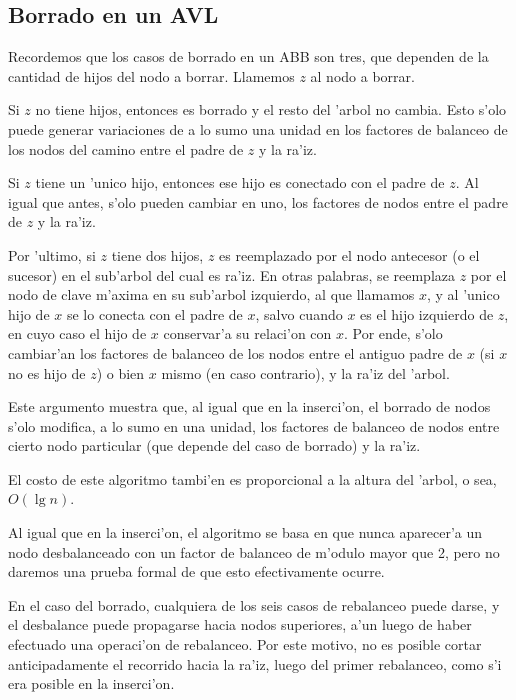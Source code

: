 \subsection{Borrado en un AVL}

Recordemos que los casos de borrado en un ABB son tres, que dependen de la cantidad de hijos del nodo a borrar. Llamemos $z$ al nodo a borrar.

Si $z$ no tiene hijos, entonces es borrado y el resto del 'arbol no cambia. Esto s'olo puede generar variaciones de a lo sumo una unidad en los factores de balanceo de los nodos del camino entre el padre de $z$ y la ra'iz.

Si $z$ tiene un 'unico hijo, entonces ese hijo es conectado con el padre de $z$. Al igual que antes, s'olo pueden cambiar en uno, los factores de nodos entre el padre de $z$ y la ra'iz.

Por 'ultimo, si $z$ tiene dos hijos, $z$ es reemplazado por el nodo antecesor (o el sucesor) en el sub'arbol del cual es ra'iz. En otras palabras, se reemplaza $z$ por el nodo de clave m'axima en su sub'arbol izquierdo, al que llamamos $x$, y al 'unico hijo de $x$ se lo conecta con el padre de $x$, salvo cuando $x$ es el hijo izquierdo de $z$, en cuyo caso el hijo de $x$ conservar'a su relaci'on con $x$. Por ende, s'olo cambiar'an los factores de balanceo de los nodos entre el antiguo padre de $x$ (si $x$ no es hijo de $z$) o bien $x$ mismo (en caso contrario), y la ra'iz del 'arbol.

Este argumento muestra que, al igual que en la inserci'on, el borrado de nodos s'olo modifica, a lo sumo en una unidad, los factores de balanceo de nodos entre cierto nodo particular (que depende del caso de borrado) y la ra'iz.



\begin{algorithm}
  	\DontPrintSemicolon
\end{algorithm}

El costo de este algoritmo tambi'en es proporcional a la altura del 'arbol, o sea, $O(\lg n)$.

Al igual que en la inserci'on, el algoritmo se basa en que nunca aparecer'a un nodo desbalanceado con un factor de balanceo de m'odulo mayor que 2, pero no daremos una prueba formal de que esto efectivamente ocurre.

En el caso del borrado, cualquiera de los seis casos de rebalanceo puede darse, y el desbalance puede propagarse hacia nodos superiores, a'un luego de haber efectuado una operaci'on de rebalanceo. Por este motivo, no es posible cortar anticipadamente el recorrido hacia la ra'iz, luego del primer rebalanceo, como s'i era posible en la inserci'on.
